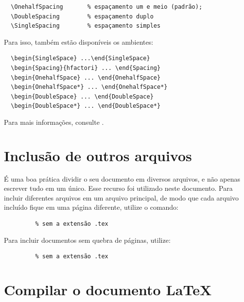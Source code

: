 \begin{verbatim}
  \OnehalfSpacing       % espaçamento um e meio (padrão); 
  \DoubleSpacing        % espaçamento duplo
  \SingleSpacing        % espaçamento simples	
\end{verbatim}

Para isso, também estão disponíveis os ambientes:

\begin{verbatim}
  \begin{SingleSpace} ...\end{SingleSpace}
  \begin{Spacing}{hfactori} ... \end{Spacing}
  \begin{OnehalfSpace} ... \end{OnehalfSpace}
  \begin{OnehalfSpace*} ... \end{OnehalfSpace*}
  \begin{DoubleSpace} ... \end{DoubleSpace}
  \begin{DoubleSpace*} ... \end{DoubleSpace*} 
\end{verbatim}

Para mais informações, consulte \cite{memoir}.

\section{Inclusão de outros arquivos}\label{sec-include}

É uma boa prática dividir o seu documento em diversos arquivos, e não
apenas escrever tudo em um único. Esse recurso foi utilizado neste
documento. Para incluir diferentes arquivos em um arquivo principal,
de modo que cada arquivo incluído fique em uma página diferente, utilize o
comando:

\begin{verbatim}
         % sem a extensão .tex
\end{verbatim}

Para incluir documentos sem quebra de páginas, utilize:

\begin{verbatim}
         % sem a extensão .tex
\end{verbatim}

\section{Compilar o documento \LaTeX}

